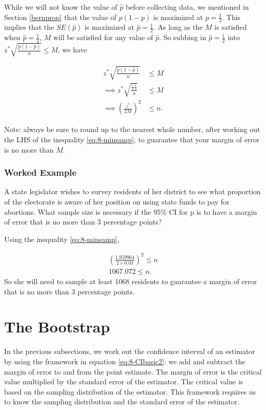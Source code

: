 \documentclass[
]{book}
\begin{document}
While we will not know the value of \(\hat{p}\) before collecting data, we mentioned in Section \ref{bernprop} that the value of \(p(1-p)\) is maximized at \(p=\frac{1}{2}\). This implies that the \(SE(\hat{p})\) is maximized at \(\hat{p} = \frac{1}{2}\). As long as the \(M\) is satisfied when \(\hat{p} = \frac{1}{2}\), \(M\) will be satisfied for any value of \(\hat{p}\). So subbing in \(\hat{p} = \frac{1}{2}\) into \(z^{*} \sqrt{\frac{\hat{p}(1-\hat{p})}{n}} \leq M\), we have

\begin{equation} 
\begin{split}
z^{*} \sqrt{\frac{\hat{p}(1-\hat{p})}{n}} & \leq M \\
\implies z^* \sqrt{\frac{\frac{1}{2}\frac{1}{2}}{n}}  & \leq M \\
\implies \left(\frac{z^*}{2M}\right)^2 & \leq n.
\end{split}
\label{eq:8-minsamp}
\end{equation}

Note: always be sure to round up to the nearest whole number, after working out the LHS of the inequality \eqref{eq:8-minsamp}, to guarantee that your margin of error is no more than \(M\).

\subsubsection{Worked Example}\label{worked-example-4}

A state legislator wishes to survey residents of her district to see what proportion of the electorate is aware of her position on using state funds to pay for abortions. What sample size is necessary if the 95\% CI for p is to have a margin of error that is no more than 3 percentage points?

Using the inequality \eqref{eq:8-minsamp},

\[
\begin{split}
\left(\frac{1.959964}{2 \times 0.03}\right)^2 \leq n \\
1067.072 \leq n.
\end{split}
\]
So she will need to sample at least 1068 residents to guarantee a margin of error that is no more than 3 percentage points.

\section{The Bootstrap}\label{the-bootstrap}

In the previous subsections, we work out the confidence interval of an estimator by using the framework in equation \eqref{eq:8-CIbasic2}: we add and subtract the margin of error to and from the point estimate. The margin of error is the critical value multiplied by the standard error of the estimator. The critical value is based on the sampling distribution of the estimator. This framework requires us to know the sampling distribution and the standard error of the estimator.
\end{document}

